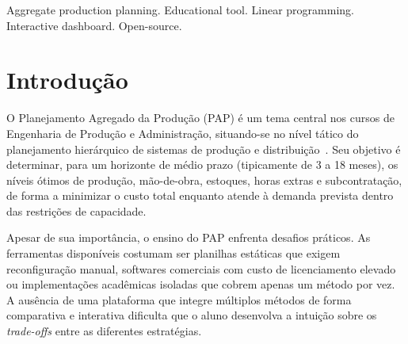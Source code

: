 \documentclass[a4paper,11pt]{article}
\begin{document}
\begin{abstract}
This paper presents an open-source interactive dashboard for teaching Aggregate Production
Planning (APP), developed in Python using the Streamlit, Plotly and SciPy libraries.
The tool integrates six classical APP methods in a single reactive web interface:
Chase Demand Strategy, Level Production, Mixed/Hybrid Strategy, Linear Programming (LP),
Transportation Method and Trial-and-Error. It further incorporates modern extensions such
as integer variables via Mixed-Integer Linear Programming (MILP) and three shortage
policies (backorders, no-shortages and lost sales). A twelve-period case study demonstrates
the comparative use of the methods, showing that LP achieves the lowest total cost.
The tool is publicly available on GitHub and Streamlit Cloud and requires no installation.
\end{abstract}

\bigskip
\begin{keywords}
Aggregate production planning. Educational tool. Linear programming. Interactive dashboard. Open-source.

\bigskip
{}
\end{keywords}


\newpage

\section{Introdução}

O Planejamento Agregado da Produção (PAP) é um tema central nos cursos de Engenharia de
Produção e Administração, situando-se no nível tático do planejamento hierárquico de
sistemas de produção e distribuição~\citep{chase2006,heizer2017}. Seu objetivo é
determinar, para um horizonte de médio prazo (tipicamente de 3 a 18 meses), os níveis
ótimos de produção, mão-de-obra, estoques, horas extras e subcontratação, de forma a
minimizar o custo total enquanto atende à demanda prevista dentro das restrições de
capacidade.

Apesar de sua importância, o ensino do PAP enfrenta desafios práticos. As ferramentas
disponíveis costumam ser planilhas estáticas que exigem reconfiguração manual, softwares comerciais com custo de licenciamento elevado ou implementações acadêmicas isoladas que
cobrem apenas um método por vez. A ausência de uma plataforma que integre múltiplos
métodos de forma comparativa e interativa dificulta que o aluno desenvolva a intuição
sobre os \textit{trade-offs} entre as diferentes estratégias.
\end{document}
